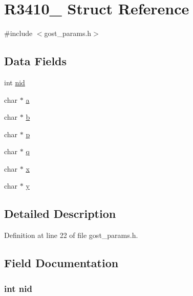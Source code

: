\hypertarget{struct_r3410__2001}{}\section{R3410\+\_ Struct Reference}
\label{struct_r3410__2001}


{\ttfamily \#include $<$gost\+\_\+params.\+h$>$}

\subsection*{Data Fields}
\begin{DoxyCompactItemize}
\item 
int \hyperlink{struct_r3410__2001_a7235ef62e89328f5155846dc59c6fc37}{nid}
\item 
char $\ast$ \hyperlink{struct_r3410__2001_ae46bdd7e2214e709576b46f5282340b8}{a}
\item 
char $\ast$ \hyperlink{struct_r3410__2001_aafe80d64508a05a94be4d07b648244d0}{b}
\item 
char $\ast$ \hyperlink{struct_r3410__2001_aaa1ebe818ec1c763a776cc580551f3e6}{p}
\item 
char $\ast$ \hyperlink{struct_r3410__2001_a5d2b44119a969086f33b7b0e909c3cdc}{q}
\item 
char $\ast$ \hyperlink{struct_r3410__2001_a87d9da60be62fb1a74b56404c392bf74}{x}
\item 
char $\ast$ \hyperlink{struct_r3410__2001_ad4d47f76a849e2c428e3dd7f8c4eab1f}{y}
\end{DoxyCompactItemize}


\subsection{Detailed Description}


Definition at line 22 of file gost\+\_\+params.\+h.



\subsection{Field Documentation}
\subsubsection[{\texorpdfstring{nid}{nid}}]{\setlength{\rightskip}{0pt plus 5cm}int nid}\hypertarget{struct_r3410__2001_a7235ef62e89328f5155846dc59c6fc37}{}\label{struct_r3410__2001_a7235ef62e89328f5155846dc59c6fc37}


